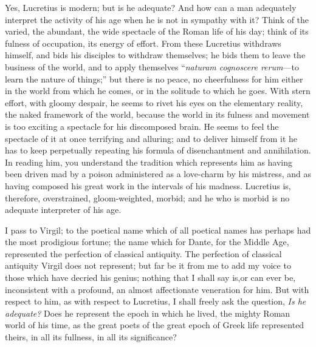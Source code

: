 Yes, Lucretius is modern; but is he adequate? And how can a man
adequately interpret the activity of his age when he is not in sympathy
with it? Think of the varied, the abundant, the wide spectacle of the
Roman life of his day; think of its fulness of occupation, its energy of
effort. From these Lucretius withdraws himself, and bids his disciples
to withdraw themselves; he bids them to leave the business of the world,
and to apply themselves ``\emph{naturam cognoscere rerum}---to learn the
nature of things;'' but there is no peace, no cheerfulness for him
either in the world from which he comes, or in the solitude to which he
goes. With stern effort, with gloomy despair, he seems to rivet his eyes
on the elementary reality, the naked framework of the world, because the
world in its fulness and movement is too exciting a spectacle for his
discomposed brain. He seems to feel the spectacle of it at once
terrifying and alluring; and to deliver himself from it he has to keep
perpetually repeating his formula of disenchantment and annihilation. In
reading him, you understand the tradition which represents him as having
been driven mad by a poison administered as a love-charm by his
mistress, and as having composed his great work in the intervals of his
madness. Lucretius is, therefore, overstrained, gloom-weighted, morbid;
and he who is morbid is no adequate interpreter of his age.

I pass to Virgil; to the poetical name which of all poetical names has
perhaps had the most prodigious fortune; the name which for Dante, for
the Middle Age, represented the perfection of classical antiquity. The
perfection of classical antiquity Virgil does not represent; but far be
it from me to add my voice to those which have decried his genius;
nothing that I shall say is,or can ever be, inconsistent with a
profound, an almost affectionate veneration for him. But with respect to
him, as with respect to Lucretius, I shall freely ask the question,
\emph{Is he adequate?} Does he represent the epoch in which he lived,
the mighty Roman world of his time, as the great poets of the great
epoch of Greek life represented theirs, in all its fullness, in all its
significance?

